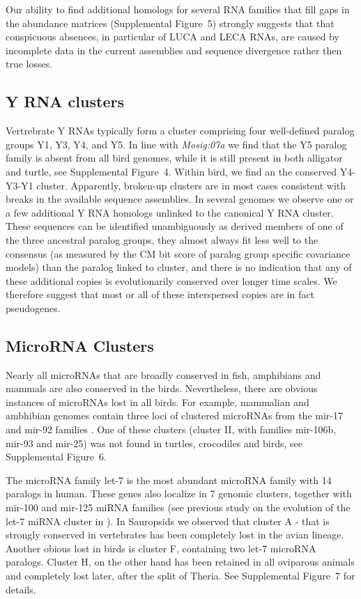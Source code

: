 \documentclass[10pt]{bmc_article}
\newenvironment{bmcformat}{\begin{raggedright}\baselineskip20pt\sloppy\setboolean{publ}{false}}{\end{raggedright}\baselineskip20pt\sloppy}
\begin{document}
\begin{bmcformat}
Our ability to find additional homologs for several RNA families that fill
gaps in the abundance matrices (Supplemental Figure~5)
strongly suggests that that conspicuous absences, in particular of LUCA and
LECA RNAs, are caused by incomplete data in the current assemblies and
sequence divergence rather then true losses.

\subsection*{Y RNA clusters} 

Vertrebrate Y RNAs typically form a cluster comprising four
well-defined paralog groups Y1, Y3, Y4, and Y5. In line with
\emph{Mosig:07a} we find that the Y5 paralog family is absent from all
bird genomes, while it is still present in both alligator and turtle,
see Supplemental Figure~4. Within bird, we find an the conserved
Y4-Y3-Y1 cluster. Apparently, broken-up clusters are in most cases
consistent with breaks in the available sequence assemblies. In
several genomes we observe one or a few additional Y RNA homologs
unlinked to the canonical Y RNA cluster. These sequences can be
identified unambiguously as derived members of one of the three
ancestral paralog groups, they almost always fit less well to the
consensus (as measured by the CM bit score of paralog group specific
covariance models) than the paralog linked to cluster, and there is no
indication that any of these additional copies is evolutionarily
conserved over longer time scales. We therefore suggest that most or
all of these interspersed copies are in fact pseudogenes.

\subsection*{MicroRNA Clusters} 

Nearly all microRNAs that are broadly conserved in fish, amphibians and
mammals are also conserved in the birds. Nevertheless, there are obvious
instances of microRNAs lost in all birds. For example, mammalian and
ambhibian genomes contain three loci of clustered microRNAs from the mir-17
and mir-92 families \cite{Tanzer:04}. One of these clusters (cluster II,
with families mir-106b, mir-93 and mir-25) was not found in turtles,
crocodiles and birds, see Supplemental Figure~6.

The microRNA family let-7 is the most abundant microRNA family with 14
paralogs in human. These genes also localize in 7 genomic clusters,
together with mir-100 and mir-125 miRNA families (see previous study on the
evolution of the let-7 miRNA cluster in \cite{Hertel:2012}). In Sauropsids
we observed that cluster A - that is strongly conserved in vertebrates has
been completely lost in the avian lineage. Another obious lost in birds is
cluster F, containing two let-7 microRNA paralogs. Cluster H, on the other
hand has been retained in all oviparous animals and completely lost later,
after the split of Theria. See Supplemental Figure~7 for details.




\end{bmcformat}
\end{document}
